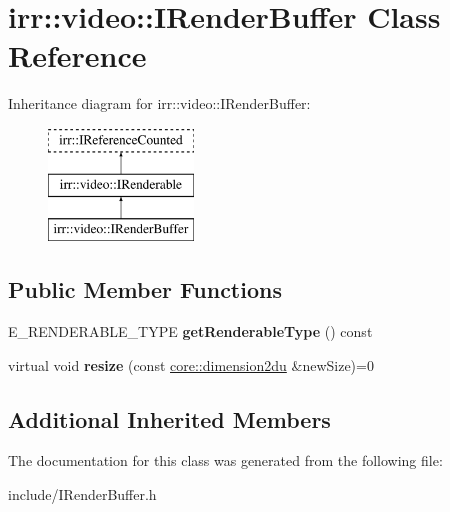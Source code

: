 \hypertarget{classirr_1_1video_1_1IRenderBuffer}{}\section{irr\+:\+:video\+:\+:I\+Render\+Buffer Class Reference}
\label{classirr_1_1video_1_1IRenderBuffer}
Inheritance diagram for irr\+:\+:video\+:\+:I\+Render\+Buffer\+:\begin{figure}[H]
\begin{center}
\leavevmode
\includegraphics[height=3.000000cm]{classirr_1_1video_1_1IRenderBuffer}
\end{center}
\end{figure}
\subsection*{Public Member Functions}
\begin{DoxyCompactItemize}
\item 
E\+\_\+\+R\+E\+N\+D\+E\+R\+A\+B\+L\+E\+\_\+\+T\+Y\+PE {\bfseries get\+Renderable\+Type} () const \hypertarget{classirr_1_1video_1_1IRenderBuffer_a517ec38fff889514abef63fba83e6900}{}\label{classirr_1_1video_1_1IRenderBuffer_a517ec38fff889514abef63fba83e6900}

\item 
virtual void {\bfseries resize} (const \hyperlink{namespaceirr_1_1core_ad2e562e3219072e2f7fc7c2bba0ef0cb}{core\+::dimension2du} \&new\+Size)=0\hypertarget{classirr_1_1video_1_1IRenderBuffer_adeb168cd12e9f9305219e2e049b5fef6}{}\label{classirr_1_1video_1_1IRenderBuffer_adeb168cd12e9f9305219e2e049b5fef6}

\end{DoxyCompactItemize}
\subsection*{Additional Inherited Members}


The documentation for this class was generated from the following file\+:\begin{DoxyCompactItemize}
\item 
include/I\+Render\+Buffer.\+h\end{DoxyCompactItemize}

